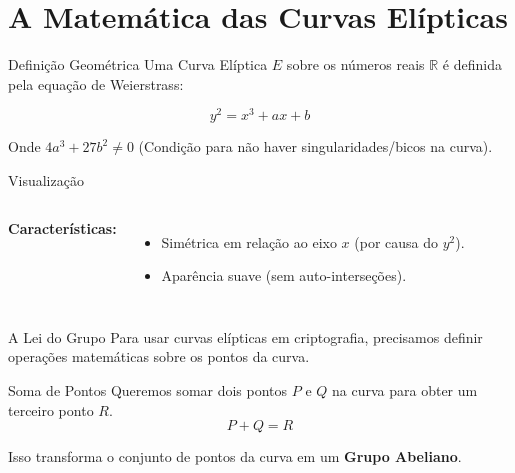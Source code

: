 \documentclass[aspectratio=169]{beamer}
\begin{document}
\section{A Matemática das Curvas Elípticas}

\begin{frame}{Definição Geométrica}
  Uma Curva Elíptica $E$ sobre os números reais $\mathbb{R}$ é definida pela equação de Weierstrass:
  
  $$ y^2 = x^3 + ax + b $$
  
  \vspace{0.3cm}
  Onde $4a^3 + 27b^2 \neq 0$ (Condição para não haver singularidades/bicos na curva).
\end{frame}

\begin{frame}{Visualização}
  \begin{columns}
      
      \textbf{Características:}
      \begin{itemize}
          \item Simétrica em relação ao eixo $x$ (por causa do $y^2$).
          \item Aparência suave (sem auto-interseções).
      \end{itemize}
  \end{columns}
\end{frame}

\begin{frame}{A Lei do Grupo}
  Para usar curvas elípticas em criptografia, precisamos definir operações matemáticas sobre os pontos da curva.
  
  \begin{block}{Soma de Pontos}
    Queremos somar dois pontos $P$ e $Q$ na curva para obter um terceiro ponto $R$.
    $$ P + Q = R $$
  \end{block}
  
  Isso transforma o conjunto de pontos da curva em um \textbf{Grupo Abeliano}.
\end{frame}
\end{document}
